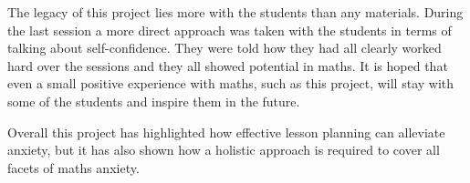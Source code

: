 \documentclass[11pt, a4paper, notitlepage]{article}
\begin{document}
The legacy of this project lies more with the students than any materials. During the last session a more direct approach was taken with the students in terms of talking about self-confidence. They were told how they had all clearly worked hard over the sessions and they all showed potential in maths. It is hoped that even a small positive experience with maths, such as this project, will stay with some of the students and inspire them in the future.
\par
Overall this project has highlighted how effective lesson planning can alleviate anxiety, but it has also shown how a holistic approach is required to cover all facets of maths anxiety.




\appendix
\end{document}
